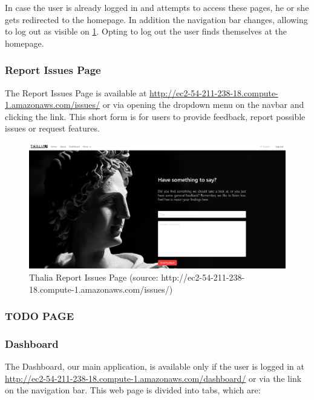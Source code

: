 \documentclass[main.tex]{subfiles}
\begin{document}
In case the user is already logged in and attempts to access these pages, he or she gets redirected to the homepage. In addition the navigation bar changes, allowing to log out as visible on \figurename{\ref{thalia_issues}}.
Opting to log out the user finds themselves at the homepage.

\subsubsection{Report Issues Page}

The Report Issues Page is available at \url{http://ec2-54-211-238-18.compute-1.amazonaws.com/issues/} or via opening the dropdown menu on the navbar and clicking the link. This short form is for users to provide feedback, 
report possible issues or request features.

\begin{figure}[H]
   \centering
   \includegraphics[width=\textwidth]{08Appendices/081User/081Pictures/issues.png}
   \caption{Thalia Report Issues Page (source: http://ec2-54-211-238-18.compute-1.amazonaws.com/issues/)}
   \label{thalia_issues}
\end{figure}

\subsubsection{TODO PAGE}

\subsubsection{Dashboard}

The Dashboard, our main application, is available only if the user is logged in at \url{http://ec2-54-211-238-18.compute-1.amazonaws.com/dashboard/} or via the link on the navigation bar.
This web page is divided into tabs, which are:
\end{document}
